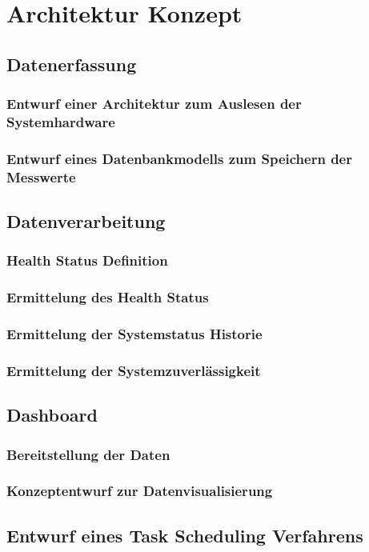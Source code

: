 \chapter{Architektur Konzept}
\section{Datenerfassung}
\subsection{Entwurf einer Architektur zum Auslesen der Systemhardware}
\subsection{Entwurf eines Datenbankmodells zum Speichern der Messwerte}

\section{Datenverarbeitung}
\subsection{Health Status Definition}
\subsection{Ermittelung des Health Status}
\subsection{Ermittelung der Systemstatus Historie}
\subsection{Ermittelung der Systemzuverlässigkeit}

\section{Dashboard}
\subsection{Bereitstellung der Daten}
\subsection{Konzeptentwurf zur Datenvisualisierung}

\section{Entwurf eines Task Scheduling Verfahrens}


